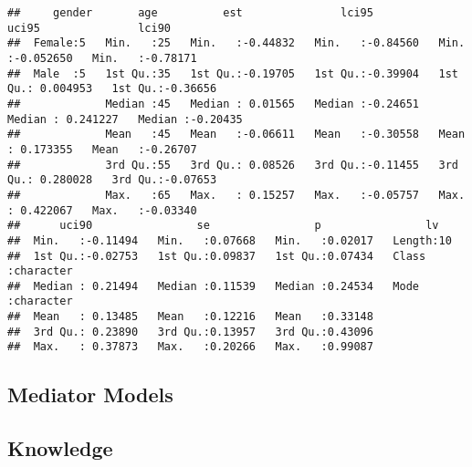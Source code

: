 \documentclass[
]{article}
\begin{document}
\begin{verbatim}
##     gender       age          est               lci95              uci95               lci90         
##  Female:5   Min.   :25   Min.   :-0.44832   Min.   :-0.84560   Min.   :-0.052650   Min.   :-0.78171  
##  Male  :5   1st Qu.:35   1st Qu.:-0.19705   1st Qu.:-0.39904   1st Qu.: 0.004953   1st Qu.:-0.36656  
##             Median :45   Median : 0.01565   Median :-0.24651   Median : 0.241227   Median :-0.20435  
##             Mean   :45   Mean   :-0.06611   Mean   :-0.30558   Mean   : 0.173355   Mean   :-0.26707  
##             3rd Qu.:55   3rd Qu.: 0.08526   3rd Qu.:-0.11455   3rd Qu.: 0.280028   3rd Qu.:-0.07653  
##             Max.   :65   Max.   : 0.15257   Max.   :-0.05757   Max.   : 0.422067   Max.   :-0.03340  
##      uci90                se                p                lv           
##  Min.   :-0.11494   Min.   :0.07668   Min.   :0.02017   Length:10         
##  1st Qu.:-0.02753   1st Qu.:0.09837   1st Qu.:0.07434   Class :character  
##  Median : 0.21494   Median :0.11539   Median :0.24534   Mode  :character  
##  Mean   : 0.13485   Mean   :0.12216   Mean   :0.33148                     
##  3rd Qu.: 0.23890   3rd Qu.:0.13957   3rd Qu.:0.43096                     
##  Max.   : 0.37873   Max.   :0.20266   Max.   :0.99087
\end{verbatim}

\hypertarget{mediator-models}{%
\subsection{Mediator Models}\label{mediator-models}}

\hypertarget{knowledge}{%
\subsection{Knowledge}\label{knowledge}}
\end{document}
